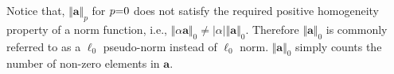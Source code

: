 \begin{remark}
Notice that, $\Vert \boldsymbol{a} \Vert _p$ for $p {=} 0$ does not satisfy the required positive homogeneity property of a norm function, i.e., $\Vert \alpha \boldsymbol{a} \Vert _0 {\neq} \vert \alpha \vert \Vert \boldsymbol{a} \Vert _0$.
Therefore $\Vert \boldsymbol{a} \Vert _0$ is commonly referred to as a $\ell_0$ pseudo-norm instead of $\ell_0$ norm.
$\Vert \boldsymbol{a} \Vert _0$ simply counts the number of non-zero elements in $\boldsymbol{a}$.
\end{remark}